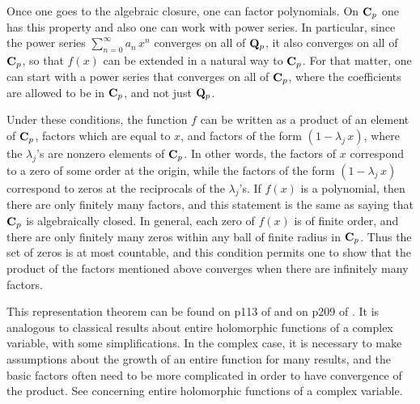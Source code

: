 \documentclass[12pt,leqno,draft]{article}
\begin{document}
	Once one goes to the algebraic closure, one can factor
polynomials.  On ${\bf C}_p$ one has this property and also one can
work with power series.  In particular, since the power series
$\sum_{n = 0}^\infty a_n \, x^n$ converges on all of ${\bf Q}_p$, it
also converges on all of ${\bf C}_p$, so that $f(x)$ can be extended
in a natural way to ${\bf C}_p$.  For that matter, one can start with
a power series that converges on all of ${\bf C}_p$, where the
coefficients are allowed to be in ${\bf C}_p$, and not just ${\bf Q}_p$.

	Under these conditions, the function $f$ can be written as
a product of an element of ${\bf C}_p$, factors which are equal to $x$,
and factors of the form $(1 - \lambda_j \, x)$, where the
$\lambda_j$'s are nonzero elements of ${\bf C}_p$.  In other words,
the factors of $x$ correspond to a zero of some order at the origin,
while the factors of the form $(1 - \lambda_j \, x)$ correspond
to zeros at the reciprocals of the $\lambda_j$'s.  If $f(x)$ is a
polynomial, then there are only finitely many factors, and this
statement is the same as saying that ${\bf C}_p$ is algebraically
closed.  In general, each zero of $f(x)$ is of finite order, and
there are only finitely many zeros within any ball of finite radius
in ${\bf C}_p$.  Thus the set of zeros is at most countable, and 
this condition permits one to show that the product of the factors
mentioned above converges when there are infinitely many factors.

	This representation theorem can be found on p113 of
\cite{Cassels} and on p209 of \cite{Gouvea}.  It is analogous to
classical results about entire holomorphic functions of a complex
variable, with some simplifications.  In the complex case, it is
necessary to make assumptions about the growth of an entire function
for many results, and the basic factors often need to be more
complicated in order to have convergence of the product.  See
\cite{Ahlfors, Veech} concerning entire holomorphic functions of
a complex variable.


	
\end{document}
